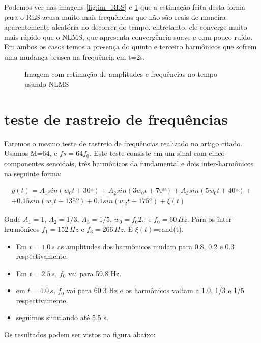 Podemos ver nas imagens \ref{fig:im_RLS} e \ref{fig:im_NLMS} que a estimação feita desta forma para o RLS acusa muito mais frequências que não são reais de maneira aparentemente aleatória no decorrer do tempo, entretanto, ele converge muito mais rápido que o NLMS, que apresenta convergência suave e com pouco ruído. Em ambos os casos temos a presença do quinto e terceiro harmônicos que sofrem uma mudança brusca na frequência em t=2s.


\begin{figure}[H]
	\centering    
	\def\svgwidth{\columnwidth}
	
	\caption{Imagem com estimação de amplitudes e frequências no tempo usando NLMS}
	\label{fig:im_NLMS}
\end{figure}


\section{teste de rastreio de frequências}

Faremos o mesmo teste de rastreio de frequências realizado no artigo citado. Usamos M=64, e $fs=64f_0$. Este teste consiste em um sinal com cinco componentes senoidais, três harmônicos da fundamental e dois inter-harmônicos na seguinte forma:

\begin{equation}
\begin{split}
	y(t)=A_1 sin(w_0 t+30º)+A_2 sin(3w_0 t+70º)+ A_3 sin(5w_0 t+40º) + \\ + 0.15 sin(w_1 t+135º)+ 0.1 sin(w_2 t + 175º) + \xi(t)
\end{split}
\end{equation}

Onde $A_1=1$, $A_2=1/3$, $A_3=1/5$, $w_0=f_0 2 \pi$ e $f_0=60 \, Hz$. Para os inter-harmônicos $f_1=152 \, Hz$ e $f_3= 266 \, Hz$. E $\xi(t)$=rand(t). 
\begin{itemize}
	\item Em $t=1.0 \,s$ as amplitudes dos harmônicos mudam para 0.8, 0.2 e 0.3 respectivamente. 
	\item Em $t=2.5 \,s$, $f_0$ vai para 59.8 Hz.
	\item em $t=4.0 \,s$, $f_0$ vai para 60.3 Hz e os harmônicos voltam a 1.0, 1/3 e 1/5 respectivamente.
	\item seguimos simulando até 5.5 s.
\end{itemize}

Os resultados podem ser vistos na figura abaixo: 

